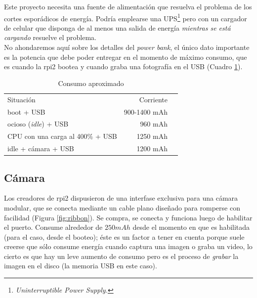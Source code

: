 \documentclass[10pt,a4paper]{article}
\begin{document}
Este proyecto necesita una fuente de alimentaci\'on que resuelva el problema de los cortes espor\'adicos de energ\'ia. Podr\'ia emplearse una UPS\footnote{\emph{Uninterruptible Power Supply.}} pero con un cargador de celular que disponga de al menos una salida de energ\'ia \emph{mientras se est\'a cargando} resuelve el problema.\\

No ahondaremos aqu\'i sobre los detalles del \emph{power bank}, el \'unico dato importante es la potencia que debe poder entregar en el momento de m\'aximo consumo, que es cuando la rpi2 bootea y cuando graba una fotograf\'ia en el USB (Cuadro \ref{tab:energia}).

\begin{table}[h!]
    \begin{center}
        \begin{tabular}{lll}
        \cline{1-2}
        \multicolumn{1}{|l|}{\cellcolor[HTML]{EFEFEF}Situaci\'on}   & \multicolumn{1}{r|}{\cellcolor[HTML]{EFEFEF}Corriente}    & \\
        \cline{1-2}
        \multicolumn{1}{|l|}{boot + USB}                            & \multicolumn{1}{r|}{900-1400 mAh}                         & \\
        \cline{1-2}
        \multicolumn{1}{|l|}{ocioso (\emph{idle}) + USB}            & \multicolumn{1}{r|}{960 mAh}                              & \\
        \cline{1-2}
        \multicolumn{1}{|l|}{CPU con una carga al 400\% + USB}      & \multicolumn{1}{r|}{1250 mAh}                             & \\
        \cline{1-2}
        \multicolumn{1}{|l|}{idle + c\'amara + USB}                 & \multicolumn{1}{r|}{1200 mAh}                             &
        \end{tabular}
    \end{center}
    \caption{Consumo aproximado}
    \label{tab:energia}
\end{table}

\subsection{C\'amara}

Los creadores de rpi2 dispusieron de una interfase exclusiva para una c\'amara modular, que se conecta mediante un cable plano dise\~nado para romperse con facilidad (Figura \ref{fig:ribbon}). Se compra, se conecta y funciona luego de habilitar el puerto. Consume alrededor de $250 mAh$ desde el momento en que es habilitada (para el caso, desde el booteo); \'este es un factor a tener en cuenta porque suele creerse que s\'olo consume energ\'ia cuando captura una imagen o graba un video, lo cierto es que hay un leve aumento de consumo pero es el proceso de \emph{grabar} la imagen en el disco (la memoria USB en este caso).\\
\end{document}

